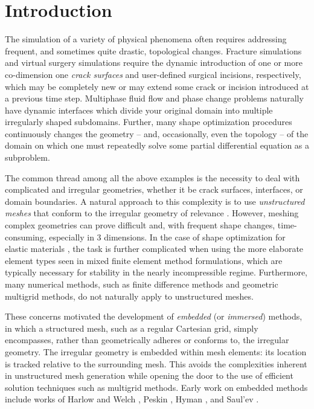 %

{}
\part*{\Huge Introduction}

The simulation of a variety of physical phenomena often requires addressing frequent, and sometimes quite drastic, topological changes. Fracture simulations and virtual surgery simulations require the dynamic introduction of one or more co-dimension one \emph{crack surfaces} and user-defined surgical incisions, respectively, which may be completely new or may extend some crack or incision introduced at a previous time step. Multiphase fluid flow and phase change problems naturally have dynamic interfaces which divide your original domain into multiple irregularly shaped subdomains. Further, many shape optimization procedures continuously changes the geometry -- and, occasionally, even the topology -- of the domain on which one must repeatedly solve some partial differential equation as a subproblem.

The common thread among all the above examples is the necessity to deal with complicated and irregular geometries, whether it be crack surfaces, interfaces, or domain boundaries. A natural approach to this complexity is to use \emph{unstructured meshes} that conform to the irregular geometry of relevance \cite{Babuska70, Bramble96, Wohlmuth99, Chen96, Huang02, Lamichhane04, Dryja05, Cockburn09}. However, meshing complex geometries can prove difficult and, with frequent shape changes, time-consuming, especially in $3$ dimensions. In the case of shape optimization for elastic materials \cite{Sethian00, Osher01, Allaire04, Duysinx06, Challis08, Wei.Peng08}, the task is further complicated when using the more elaborate element types seen in mixed finite element method formulations, which are typically necessary for stability in the nearly incompressible regime. Furthermore, many numerical methods, such as finite difference methods and geometric multigrid methods, do not naturally apply to unstructured meshes.

These concerns motivated the development of \emph{embedded} (or \emph{immersed}) methods, in which a structured mesh, such as a regular Cartesian grid, simply encompasses, rather than geometrically adheres or conforms to, the irregular geometry. The irregular geometry is embedded within mesh elements: its location is tracked relative to the surrounding mesh. This avoids the complexities inherent in unstructured mesh generation while opening the door to the use of efficient solution techniques such as multigrid methods. Early work on embedded methods include works of Harlow and Welch \cite{Harlow65}, Peskin \cite{Peskin72}, Hyman \cite{Hyman52}, and Saul'ev \cite{Saul'ev63}.

